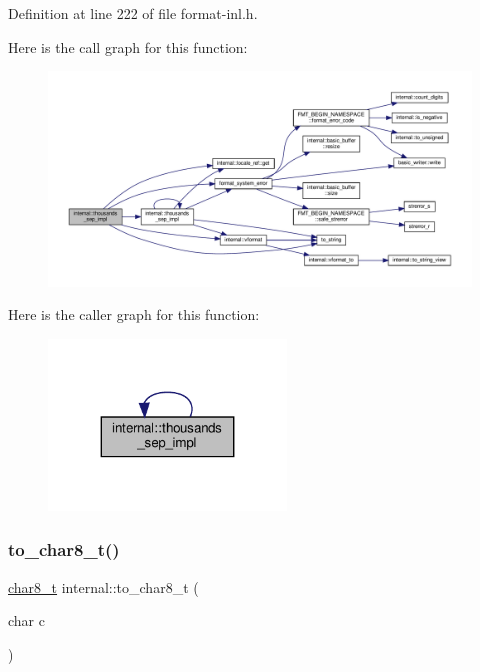 Definition at line 222 of file format-\/inl.\+h.

Here is the call graph for this function\+:
\nopagebreak
\begin{figure}[H]
\begin{center}
\leavevmode
\includegraphics[width=350pt]{namespaceinternal_a0eb92e21789faf5174aa9bb86bb78539_cgraph}
\end{center}
\end{figure}
Here is the caller graph for this function\+:
\nopagebreak
\begin{figure}[H]
\begin{center}
\leavevmode
\includegraphics[width=179pt]{namespaceinternal_a0eb92e21789faf5174aa9bb86bb78539_icgraph}
\end{center}
\end{figure}
\mbox{\label{namespaceinternal_aec25b0e61826253efb4ca1d710a60a0d}} 
\subsubsection{\texorpdfstring{to\+\_\+char8\+\_\+t()}{to\_char8\_t()}}
{\footnotesize\ttfamily \hyperlink{format_8h_ad71c872603735b57c8417f76de44077b}{char8\+\_\+t} internal\+::to\+\_\+char8\+\_\+t (\begin{DoxyParamCaption}\item[{char}]{c }\end{DoxyParamCaption})\hspace{0.3cm}{\ttfamily [inline]}}



